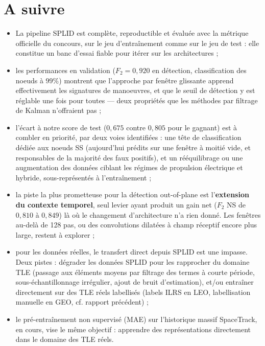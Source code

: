 \documentclass{article}
\begin{document}
\section{A suivre}
\begin{itemize}
    \item La pipeline SPLID est complète, reproductible et évaluée avec la métrique officielle du concours, sur le jeu d'entraînement comme sur le jeu de test : elle constitue un banc d'essai fiable pour itérer sur les architectures ;
    \item les performances en validation ($F_2 = 0{,}920$ en détection, classification des noeuds à $99\%$) montrent que l'approche par fenêtre glissante apprend effectivement les signatures de manoeuvres, et que le seuil de détection y est réglable une fois pour toutes — deux propriétés que les méthodes par filtrage de Kalman n'offraient pas ;
    \item l'écart à notre score de test ($0{,}675$ contre $0{,}805$ pour le gagnant) est à combler en priorité, par deux voies identifiées : une tête de classification dédiée aux noeuds SS (aujourd'hui prédits sur une fenêtre à moitié vide, et responsables de la majorité des faux positifs), et un rééquilibrage ou une augmentation des données ciblant les régimes de propulsion électrique et hybride, sous-représentés à l'entraînement ;
    \item la piste la plus prometteuse pour la détection out-of-plane est l'\textbf{extension du contexte temporel}, seul levier ayant produit un gain net ($F_2$ NS de $0{,}810$ à $0{,}849$) là où le changement d'architecture n'a rien donné. Les fenêtres au-delà de 128 pas, ou des convolutions dilatées à champ réceptif encore plus large, restent à explorer ;
    \item pour les données réelles, le transfert direct depuis SPLID est une impasse. Deux pistes : dégrader les données SPLID pour les rapprocher du domaine TLE (passage aux éléments moyens par filtrage des termes à courte période, sous-échantillonnage irrégulier, ajout de bruit d'estimation), et/ou entraîner directement sur des TLE réels labellisés (labels ILRS en LEO, labellisation manuelle en GEO, cf. rapport précédent) ;
    \item le pré-entraînement non supervisé (MAE) sur l'historique massif SpaceTrack, en cours, vise le même objectif : apprendre des représentations directement dans le domaine des TLE réels.
\end{itemize}
\end{document}
